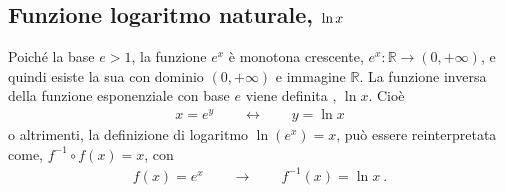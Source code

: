 \documentclass[letterpaper,10pt,italian]{jupyterBook}
\begin{document}
\subsection{Funzione logaritmo naturale, \protect\(\text{ln} \, x\protect\)}
\label{\detokenize{ch/precalculus/exponential_logarithm:funzione-logaritmo-naturale-text-ln-x}}\label{\detokenize{ch/precalculus/exponential_logarithm:math-hs-exp-def-ln}}
\sphinxAtStartPar
{} Poiché la base \(e > 1\), la funzione \(e^x\) è monotona crescente, \(e^x: \mathbb{R} \rightarrow (0, +\infty)\), e quindi esiste la sua {\hyperref[\detokenize{ch/precalculus/real-functions:math-hs-precalculus-real-functions-inverse}]{}} con dominio \((0,+\infty)\) e immagine \(\mathbb{R}\). La funzione inversa della funzione esponenziale con base \(e\) viene definita , \(\ln x\). Cioè
\begin{equation*}
\begin{split}x = e^y \qquad \leftrightarrow \qquad y = \ln x\end{split}
\end{equation*}
\sphinxAtStartPar
o altrimenti, la definizione di logaritmo \(\ln ( e^x ) = x\), può essere reinterpretata come, \(f^{-1} \circ f(x) = x \), con
\begin{equation*}
\begin{split}f(x) = e^x \qquad \rightarrow \qquad f^{-1}(x) = \ln x \ .\end{split}
\end{equation*}
\end{document}
